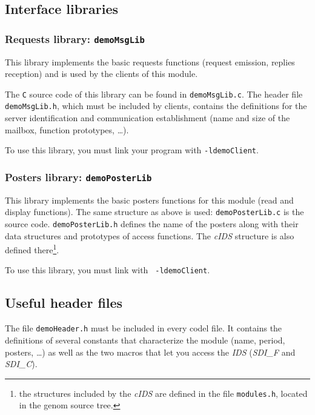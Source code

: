 \subsection{Interface libraries}

\subsubsection{Requests library: \texttt{demoMsgLib}}

This library implements  the basic requests  functions (request emission,
replies reception) and is used by the clients of this module.

The \texttt{C}  source code    of  this  library  can be   found  in  
\texttt{demoMsgLib.c}.  The header
file \texttt{demoMsgLib.h}, which must  be included by clients, contains the
definitions for the server identification and communication establishment
(name and size of the mailbox, function prototypes, \ldots).

To use this  library, you must link your  program with  
\texttt{-ldemoClient}. 


\subsubsection{Posters library: \texttt{demoPosterLib}}

This library implements the basic posters functions for this module (read
and display   functions).  The same    structure as above  is used:  
\texttt{demoPosterLib.c} is  the  source code. 
\texttt{demoPosterLib.h}   defines the name  of  the
posters along  with  their data structures and prototypes of access
functions.
The  \emph{cIDS} structure is
also defined there\footnote{the structures included by the \emph{cIDS} are
defined in the file \texttt{modules.h}, located in the genom source tree.}.

To  use this library,  you must link  with  \texttt{
-ldemoClient}.


\subsection{Useful header files}

The file \texttt{demoHeader.h} must  be included  in every  codel file.  It
contains the definitions of several constants that characterize the module
(name, period, posters, \ldots)  as well as the two  macros that let  you
access the \emph{IDS} (\emph{SDI\_F} and \emph{SDI\_C}).

